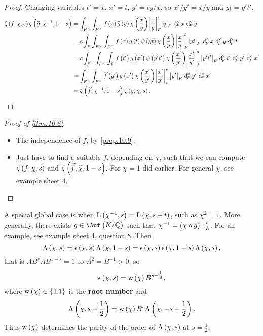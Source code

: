 \begin{proof}
Changing variables $ t' = x $, $ x' = t $, $ y' = ty / x $, so $ x' / y' = x / y $ and $ yt = y't' $,
\begin{align*}
\zeta\br{f, \chi, s}\zeta\br{\widehat{g}, \chi^{-1}, 1 - s}
& = \intFX{\intFX{f\br{x}\widehat{g}\br{y}\chi\br{\dfrac{x}{y}}\abs{\dfrac{x}{y}}_F^s\abs{y}_F}{x}}{y} \\
& = c\intFX[F]{\intFX{\intFX{f\br{x}g\br{t}\psi\br{yt}\chi\br{\dfrac{x}{y}}\abs{\dfrac{x}{y}}_F^s\abs{yt}_F}{x}}{y}}{t} \\
& = c\intFX{\intFX{\intFX[F]{f\br{t'}g\br{x'}\psi\br{y't'}\chi\br{\dfrac{x'}{y'}}\abs{\dfrac{x'}{y'}}_F^s\abs{y't'}_F}{t'}}{y'}}{x'} \\
& = \intFX{\intFX{\widehat{f}\br{y'}g\br{x'}\chi\br{\dfrac{x'}{y'}}\abs{\dfrac{x'}{y'}}_F^s\abs{y'}_F}{y'}}{x'} \\
& = \zeta\br{\widehat{f}, \chi^{-1}, 1 - s}\zeta\br{g, \chi, s}.
\end{align*}
\end{proof}

\begin{proof}[Proof of \ref{thm:10.8}]
\hfill
\begin{itemize}
\item The independence of $ f $, by \ref{prop:10.9}.
\item Just have to find a suitable $ f $, depending on $ \chi $, such that we can compute $ \zeta\br{f, \chi, s} $ and $ \zeta\br{\widehat{f}, \widehat{\chi}, 1 - s} $. For $ \chi = 1 $ did earlier. For general $ \chi $, see example sheet $ 4 $.
\end{itemize}
\end{proof}

A special global case is when $ \L\br{\chi^{-1}, s} = \L\br{\chi, s + t} $, such as $ \chi^2 = 1 $. More generally, there exists $ g \in \Aut\br{K / \QQ} $ such that $ \chi^{-1} = \br{\chi \circ g}\abs{\cdot}_\AA^t $. For an example, see example sheet $ 4 $, question $ 8 $. Then
$$ \Lambda\br{\chi, s} = \epsilon\br{\chi, s}\Lambda\br{\chi, 1 - s} = \epsilon\br{\chi, s}\epsilon\br{\chi, 1 - s}\Lambda\br{\chi, s}, $$
that is $ AB^sAB^{1 - s} = 1 $ so $ A^2 = B^{-1} > 0 $, so
$$ \epsilon\br{\chi, s} = \w\br{\chi}B^{s - \tfrac{1}{2}}, $$
where $ \w\br{\chi} \in \cbr{\pm 1} $ is the \textbf{root number} and
$$ \Lambda\br{\chi, s + \dfrac{1}{2}} = \w\br{\chi}B^s\Lambda\br{\chi, -s + \dfrac{1}{2}}. $$
Thus $ \w\br{\chi} $ determines the parity of the order of $ \Lambda\br{\chi, s} $ at $ s = \tfrac{1}{2} $.

